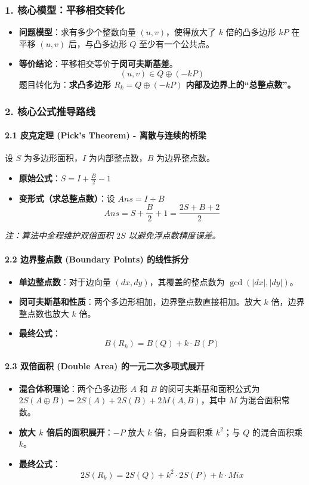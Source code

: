 \subsubsection*{1. 核心模型：平移相交转化}
\begin{itemize}
    \item \textbf{问题模型}：求有多少个整数向量 $(u, v)$，使得放大了 $k$ 倍的凸多边形 $kP$ 在平移 $(u, v)$ 后，与凸多边形 $Q$ 至少有一个公共点。
    \item \textbf{等价结论}：平移相交等价于\textbf{闵可夫斯基差}。
    $$(u, v) \in Q \oplus (-kP)$$
    题目转化为：\textbf{求凸多边形 $R_k = Q \oplus (-kP)$ 内部及边界上的“总整点数”。}
\end{itemize}

\hrulefill

\subsubsection*{2. 核心公式推导路线}

\paragraph{2.1 皮克定理 (Pick's Theorem) - 离散与连续的桥梁}
设 $S$ 为多边形面积，$I$ 为内部整点数，$B$ 为边界整点数。
\begin{itemize}
    \item \textbf{原始公式}：$S = I + \frac{B}{2} - 1$
    \item \textbf{变形式（求总整点数）}：设 $Ans = I + B$
    $$Ans = S + \frac{B}{2} + 1 = \frac{2S + B + 2}{2}$$
\end{itemize}
\textit{注：算法中全程维护双倍面积 $2S$ 以避免浮点数精度误差。}

\paragraph{2.2 边界整点数 (Boundary Points) 的线性拆分}
\begin{itemize}
    \item \textbf{单边整点数}：对于边向量 $(dx, dy)$，其覆盖的整点数为 $\gcd(|dx|, |dy|)$。
    \item \textbf{闵可夫斯基和性质}：两个多边形相加，边界整点数直接相加。放大 $k$ 倍，边界整点数也放大 $k$ 倍。
    \item \textbf{最终公式}：
    $$B(R_k) = B(Q) + k \cdot B(P)$$
\end{itemize}

\paragraph{2.3 双倍面积 (Double Area) 的一元二次多项式展开}
\begin{itemize}
    \item \textbf{混合体积理论}：两个凸多边形 $A$ 和 $B$ 的闵可夫斯基和面积公式为 $2S(A \oplus B) = 2S(A) + 2S(B) + 2M(A, B)$，其中 $M$ 为混合面积常数。
    \item \textbf{放大 $k$ 倍后的面积展开}：$-P$ 放大 $k$ 倍，自身面积乘 $k^2$；与 $Q$ 的混合面积乘 $k$。
    \item \textbf{最终公式}：
    $$2S(R_k) = 2S(Q) + k^2 \cdot 2S(P) + k \cdot Mix$$
\end{itemize}

